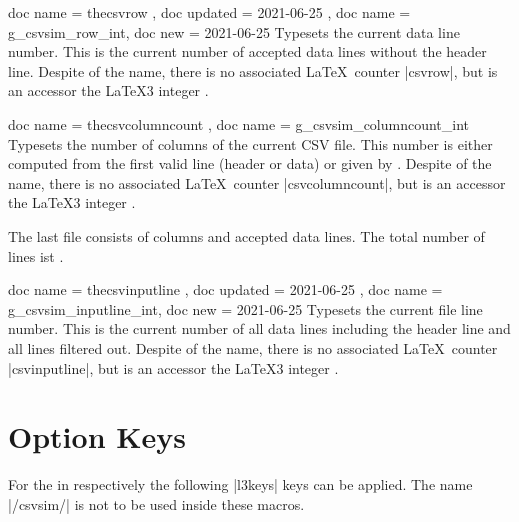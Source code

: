 \documentclass[a4paper,11pt]{ltxdoc}
\begin{document}
\clearpage
\begin{docCommands}{
    { doc name = thecsvrow       , doc updated = 2021-06-25 },
    { doc name = g_csvsim_row_int, doc new     = 2021-06-25 }
  }
  Typesets the current data line number. This is the
  current number of accepted data lines without the header line.
  Despite of the name, there is no associated \LaTeX\ counter |csvrow|,
  but  is an accessor the \LaTeX3 integer
  .
\end{docCommands}


\begin{docCommands}[doc new=2021-06-25]{
    { doc name = thecsvcolumncount },
    { doc name = g_csvsim_columncount_int }
  }
  Typesets the number of columns of the current CSV file. This number
  is either computed from the first valid line (header or data) or
  given by .
  Despite of the name, there is no associated \LaTeX\ counter |csvcolumncount|,
  but  is an accessor the \LaTeX3 integer
  .
\begin{dispExample}
%
The last file consists of \thecsvcolumncount{} columns and
\thecsvrow{} accepted data lines. The total number of lines
ist \thecsvinputline{}.
\end{dispExample}
\end{docCommands}


\begin{docCommands}{
    { doc name = thecsvinputline       , doc updated = 2021-06-25 },
    { doc name = g_csvsim_inputline_int, doc new     = 2021-06-25 }
  }
  Typesets the current file line number. This is the
  current number of all data lines including the header line and all
  lines filtered out.
  Despite of the name, there is no associated \LaTeX\ counter |csvinputline|,
  but  is an accessor the \LaTeX3 integer
  .
\begin{dispExample}
\end{dispExample}
\end{docCommands}





\clearpage
\section{Option Keys}\label{sec:schluessel}%
For the  in  respectively 
the following |l3keys| keys can be applied. The  name |/csvsim/| is not
to be used inside these macros.
\end{document}
